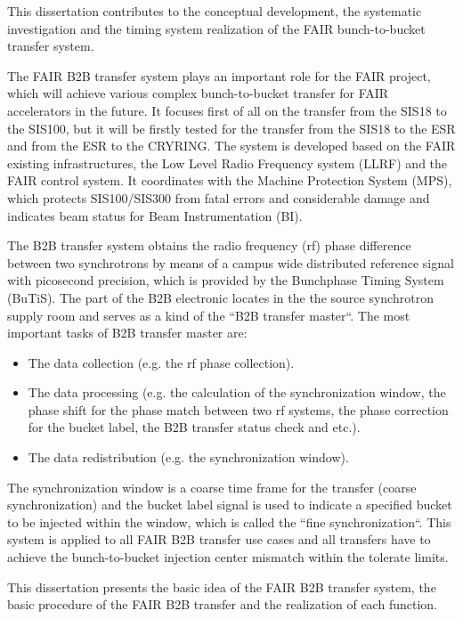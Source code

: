 This dissertation contributes to the conceptual development, the systematic investigation and the timing system realization of the FAIR bunch-to-bucket transfer system. 

The FAIR B2B transfer system plays an important role for the FAIR project, which will achieve various complex bunch-to-bucket transfer for FAIR accelerators in the future. It focuses first of all on the transfer from the SIS18 to the SIS100, but it will be firstly tested for the transfer from the SIS18 to the ESR and from the ESR to the CRYRING. The system is developed based on the FAIR existing infrastructures, the Low Level Radio Frequency system (LLRF) and the FAIR control system. It coordinates with the Machine Protection System (MPS), which protects SIS100/SIS300 from fatal errors and considerable damage and indicates beam status for Beam Instrumentation (BI). 
 
The B2B transfer system obtains the radio frequency (rf) phase difference between two synchrotrons by means of a campus wide distributed reference signal with picosecond precision, which is provided by the Bunchphase Timing System (BuTiS). The part of the B2B electronic locates in the the source synchrotron supply room and serves as a kind of the ``B2B transfer master``. The most important tasks of B2B transfer master are:
\begin{itemize}

	\item 	The data collection (e.g. the rf phase collection). 

   \item 	The data processing (e.g. the calculation of the synchronization window, the phase shift for the phase match between two rf systems, the phase correction for the bucket label, the B2B transfer status check and etc.). 

   \item 	The data redistribution (e.g. the synchronization window).
\end{itemize}
The synchronization window is a coarse time frame for the transfer (coarse synchronization) and the bucket label signal is used to indicate a specified bucket to be injected within the window, which is called the ``fine synchronization``. This system is applied to all FAIR B2B transfer use cases and all transfers have to achieve the bunch-to-bucket injection center mismatch within the tolerate limits.

This dissertation presents the basic idea of the FAIR B2B transfer system, the basic procedure of the FAIR B2B transfer and the realization of each function.


